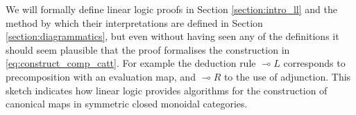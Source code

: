 \documentclass[english,letter paper,12pt,reqno]{article}
\theoremstyle{example}
\numberwithin{equation}{section}
\def\Hom{\operatorname{Hom}}
\begin{document}
We will formally define linear logic proofs in Section \ref{section:intro_ll} and the method by which their interpretations are defined in Section \ref{section:diagrammatics}, but even without having seen any of the definitions it should seem plausible that the proof formalises the construction in \eqref{eq:construct_comp_catt}. For example the deduction rule $\multimap L$ corresponds to precomposition with an evaluation map, and $\multimap R$ to the use of adjunction. This sketch indicates how linear logic provides algorithms for the construction of canonical maps in symmetric closed monoidal categories. %
\\



\end{document}
